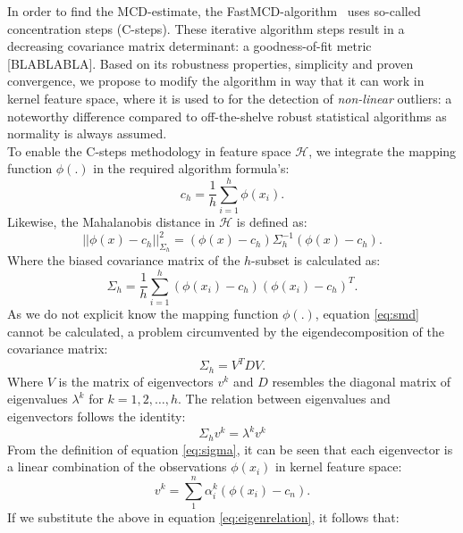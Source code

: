 \documentclass[preprint,12pt]{elsarticle}
\begin{document}
	In order to find the MCD-estimate, the FastMCD-algorithm~\cite{rousseeuw1999fast} uses so-called concentration steps (C-steps). These iterative algorithm steps result in a decreasing covariance matrix determinant: a goodness-of-fit metric [BLABLABLA]. Based on its robustness properties, simplicity and proven convergence, we propose to modify the algorithm in way that it can work in kernel feature space, where it is used to for the detection of \textit{non-linear} outliers: a noteworthy difference compared to off-the-shelve robust statistical algorithms as normality is always assumed. \\
	
	To enable the C-steps methodology in feature space $\mathcal{H}$, we integrate the mapping function $\phi(.)$ in the required algorithm formula's: 
	\begin{equation}
	\label{eq:center}
	c_h = \frac{1}{h} \sum_{i=1}^{h}\phi(x_i).
	\end{equation}
	Likewise, the Mahalanobis distance in $\mathcal{H}$ is defined as:
	\begin{equation}
	\label{eq:smd}
	||\phi(x) - c_h||^2_{\Sigma_h} = (\phi(x) - c_h) \Sigma^{-1}_h (\phi(x) - c_h).
	\end{equation}
	Where the biased covariance matrix of the $h$-subset is calculated as:
	\begin{equation}
	\Sigma_h = \frac{1}{h} \sum_{i=1}^{h} (\phi(x_i) - c_h) (\phi(x_i) - c_h)^T.
	\label{eq:sigma}
	\end{equation}
	As we do not explicit know the mapping function $\phi(.)$, equation \eqref{eq:smd} cannot be calculated, a problem circumvented by the eigendecomposition of the covariance matrix:
	\begin{equation}
	\Sigma_h = V^T D V.
	\end{equation}
	Where $V$ is the matrix of eigenvectors $v^k$ and $D$ resembles the diagonal matrix of eigenvalues $\lambda^k$ for $k=1,2, \dots, h$. The relation between eigenvalues and eigenvectors follows the identity:
	\begin{equation}
	\label{eq:eigenrelation}
	\Sigma_h v^k = \lambda^k v^k
	\end{equation} 
	From the definition of equation \eqref{eq:sigma}, it can be seen that each eigenvector is a linear combination of the observations $\phi(x_i)$ in kernel feature space:
	\begin{equation}
	v^k = \sum_{1}^{n} \alpha_i^k ( \phi(x_i) - c_n). 
	\end{equation}
	If we substitute the above in equation \eqref{eq:eigenrelation}, it follows that:
\end{document}
